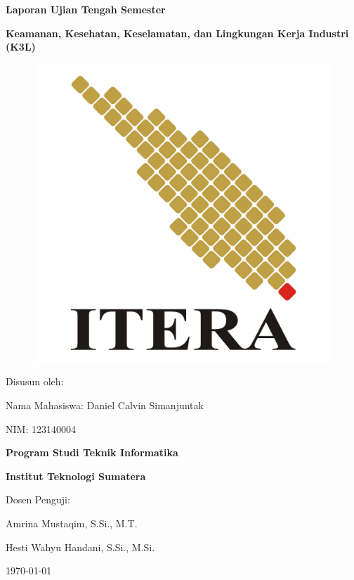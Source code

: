 \documentclass[a4paper, 12pt]{article}
\begin{document}
\begin{titlepage}
    \centering
    
    {\Huge\bfseries Laporan Ujian Tengah Semester\par}
    \vspace{0.5cm}
    {\LARGE\bfseries Keamanan, Kesehatan, Keselamatan, dan Lingkungan Kerja Industri (K3L)\par}
    
    \vspace{2.5cm}
    \begin{figure}[htbp] 
        \centering
        \includegraphics[width=0.4\linewidth]{Logo_ITERA.png}
        \label{fig:logo}
    \end{figure}
    {\large Disusun oleh:\par}
    \vspace{0.5cm}
    {\Large Nama Mahasiswa: Daniel Calvin Simanjuntak\par}
    {\Large NIM: 123140004\par}
    
    {\large\bfseries Program Studi Teknik Informatika\par}
    {\large\bfseries Institut Teknologi Sumatera\par}
    \vspace{0.5cm}
    {\large Dosen Penguji:\par}
    {\large Amrina Mustaqim, S.Si., M.T.\par}
    {\large Hesti Wahyu Handani, S.Si., M.Si.\par}
    \vspace{0.5cm}
    {\large \today\par} 
\end{titlepage}
\end{document}
